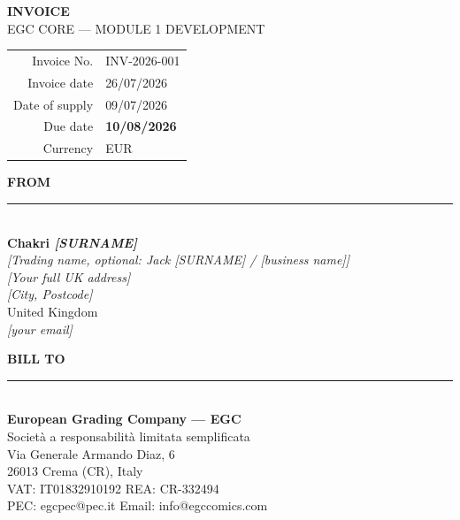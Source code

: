 \documentclass[10.5pt]{article}
\newcommand{\sectiontitle}[1]{%
  {\headingfont\bfseries\fontsize{9.5}{9.5}\selectfont\color{navy}\MakeUppercase{#1}}\\[1pt]
  {\color{gold}\rule{\linewidth}{0.9pt}}\\[7pt]
}
\newcommand{\ph}[1]{{\color{slate}\itshape #1}}
\begin{document}
\vspace*{0.4cm}
\hspace*{-0.1cm}%
\begin{minipage}[t]{0.55\textwidth}
  \vspace{0.3cm}
  \color{white}
  {\headingfont\bfseries\fontsize{26}{26}\selectfont INVOICE}\\[3pt]
  {\color{gold}\footnotesize\headingfont EGC CORE — MODULE 1 DEVELOPMENT}
\end{minipage}%
\begin{minipage}[t]{0.45\textwidth}
  \vspace{0.35cm}
  \RaggedLeft
  \color{white}
  \begin{tabular}{@{}rl@{}}
    {\footnotesize\color{gold}Invoice No.} & \footnotesize INV-2026-001 \\
    {\footnotesize\color{gold}Invoice date} & \footnotesize 26/07/2026 \\
    {\footnotesize\color{gold}Date of supply} & \footnotesize 09/07/2026 \\
    {\footnotesize\color{gold}Due date} & \footnotesize\bfseries 10/08/2026 \\
    {\footnotesize\color{gold}Currency} & \footnotesize EUR \\
  \end{tabular}
\end{minipage}

\vspace{0.65cm}

\begin{minipage}[t]{0.48\textwidth}
  \sectiontitle{From}
  \textbf{Chakri \ph{[SURNAME]}}\\
  \ph{[Trading name, optional: Jack [SURNAME] / [business name]]}\\[3pt]
  \ph{[Your full UK address]}\\
  \ph{[City, Postcode]}\\
  United Kingdom\\[3pt]
  \ph{[your email]} \quad \ph{[phone --- optional]}
\end{minipage}%
\hfill
\begin{minipage}[t]{0.48\textwidth}
  \sectiontitle{Bill to}
  \textbf{European Grading Company --- EGC}\\
  Società a responsabilità limitata semplificata\\[3pt]
  Via Generale Armando Diaz, 6\\
  26013 Crema (CR), Italy\\[3pt]
  VAT: IT01832910192 \quad REA: CR-332494\\
  PEC: egcpec@pec.it \quad Email: info@egccomics.com
\end{minipage}
\end{document}
